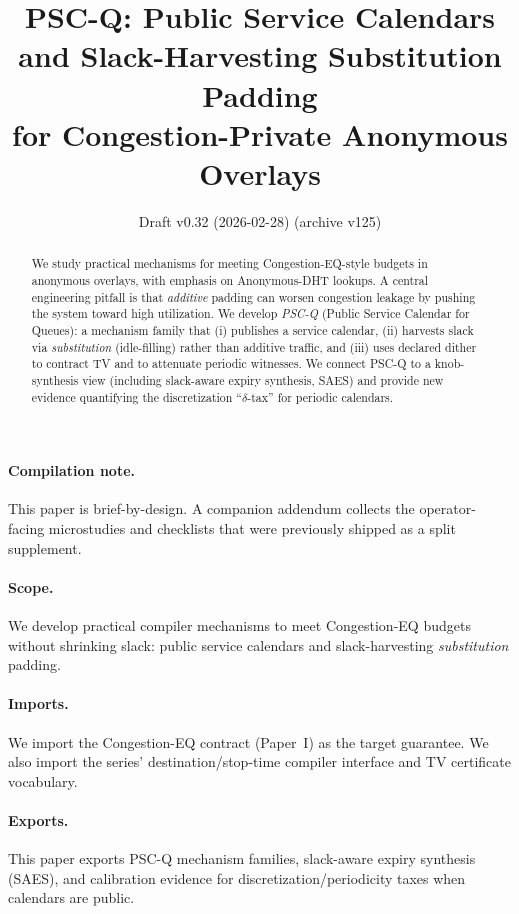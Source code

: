 \documentclass[11pt]{article}
\title{PSC-Q: Public Service Calendars and Slack-Harvesting Substitution Padding \\ for Congestion-Private Anonymous Overlays}
\author{}
\date{Draft v0.32 (2026-02-28) (archive v125)}
\theoremstyle{definition}
\theoremstyle{remark}
\begin{document}
\maketitle

\begin{abstract}
We study practical mechanisms for meeting Congestion-EQ-style budgets in anonymous overlays, with emphasis on Anonymous-DHT lookups.
A central engineering pitfall is that \emph{additive} padding can worsen congestion leakage by pushing the system toward high utilization.
We develop \emph{PSC-Q} (Public Service Calendar for Queues): a mechanism family that (i) publishes a service calendar, (ii) harvests slack via \emph{substitution} (idle-filling) rather than additive traffic, and (iii) uses declared dither to contract TV and to attenuate periodic witnesses.
We connect PSC-Q to a knob-synthesis view (including slack-aware expiry synthesis, SAES) and provide new evidence quantifying the discretization ``$\delta$-tax'' for periodic calendars.
\end{abstract}
\paragraph{Compilation note.}
This paper is brief-by-design. A companion addendum collects the operator-facing microstudies and checklists that were previously shipped as a split supplement.\cite{series:pscqaddendum}

\paragraph{Scope.}
We develop practical compiler mechanisms to meet Congestion-EQ budgets without shrinking slack: public service calendars and slack-harvesting \emph{substitution} padding.

\paragraph{Imports.}
We import the Congestion-EQ contract (Paper~I) as the target guarantee.\cite{series:congeq}
We also import the series' destination/stop-time compiler interface and TV certificate vocabulary.\cite{series:schedcompiler,series:knapsacktransport}

\paragraph{Exports.}
This paper exports PSC-Q mechanism families, slack-aware expiry synthesis (SAES), and calibration evidence for discretization/periodicity taxes when calendars are public.
\end{document}
